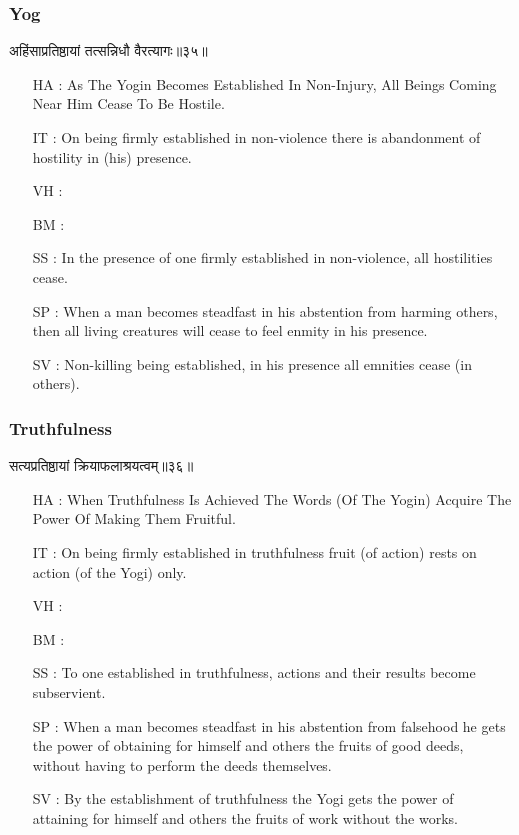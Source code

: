\begin{frame}[fragile]\frametitle{Yog}
\begin{sanskrit}
अहिंसाप्रतिष्ठायां तत्सन्निधौ वैरत्यागः॥३५॥
\end{sanskrit}

	\begin{itemize}
	\item [HA]: As The Yogin Becomes Established In Non-Injury, All Beings Coming Near Him Cease To Be Hostile.
	\item [IT]: On being firmly established in non-violence there is abandonment of hostility in (his) presence.
	\item [VH]: 
	\item [BM]: 
	\item [SS]: In the presence of one firmly established in non-violence, all hostilities cease.
	\item [SP]: When a man becomes steadfast in his abstention from harming others, then all living creatures will cease to feel enmity in his presence.
	\item [SV]: Non-killing being established, in his presence all emnities cease (in others). 
	\end{itemize}
\end{frame}


\begin{frame}[fragile]\frametitle{Truthfulness}
\begin{sanskrit}
सत्यप्रतिष्ठायां क्रियाफलाश्रयत्वम्॥३६॥
\end{sanskrit}

	\begin{itemize}
	\item [HA]: When Truthfulness Is Achieved The Words (Of The Yogin) Acquire The Power Of Making Them Fruitful.
	\item [IT]: On being firmly established in truthfulness fruit (of action) rests on action (of the Yogi) only.
	\item [VH]: 
	\item [BM]: 
	\item [SS]: To one established in truthfulness, actions and their results become subservient.
	\item [SP]: When a man becomes steadfast in his abstention from falsehood he gets the power of obtaining for himself and others the fruits of good deeds, without having to perform the deeds themselves.
	\item [SV]: By the establishment of truthfulness the Yogi gets the power of attaining for himself and others the fruits of work without the works. 
	\end{itemize}
\end{frame}



